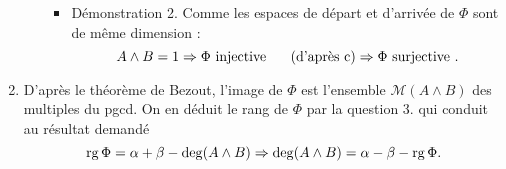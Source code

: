 \begin{enumerate}
\begin{enumerate}
\begin{itemize}
 \item Démonstration 2. Comme les espaces de départ et d'arrivée de $\Phi$ sont de même dimension :
\begin{displaymath}
 A\wedge B =1 \Rightarrow \Phi \text{ injective }  \hspace{0.5cm}\text{(d'après c)}
\Rightarrow \Phi \text{ surjective } . 
\end{displaymath}

\end{itemize}
\end{enumerate}

\item D'après le théorème de Bezout, l'image de $\Phi$ est l'ensemble $\mathcal M(A\wedge B)$ des multiples du pgcd. On en déduit le rang de $\Phi$ par la question 3. qui conduit au résultat demandé
\begin{displaymath}
 \operatorname{rg} \Phi = \alpha + \beta -\deg(A\wedge B)\Rightarrow
\deg(A\wedge B) = \alpha - \beta -\operatorname{rg} \Phi .
\end{displaymath}

\end{enumerate}

